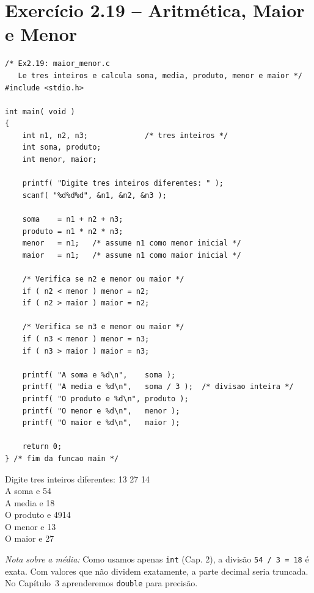 \documentclass[12pt,a4paper]{article}
\begin{document}
\section{Exercício 2.19 -- Aritmética, Maior e Menor}

\begin{respostabox}[title={Exercício 2.19 -- Soma, média, produto, menor e maior}]
\begin{lstlisting}
/* Ex2.19: maior_menor.c
   Le tres inteiros e calcula soma, media, produto, menor e maior */
#include <stdio.h>

int main( void )
{
    int n1, n2, n3;             /* tres inteiros */
    int soma, produto;
    int menor, maior;

    printf( "Digite tres inteiros diferentes: " );
    scanf( "%d%d%d", &n1, &n2, &n3 );

    soma    = n1 + n2 + n3;
    produto = n1 * n2 * n3;
    menor   = n1;   /* assume n1 como menor inicial */
    maior   = n1;   /* assume n1 como maior inicial */

    /* Verifica se n2 e menor ou maior */
    if ( n2 < menor ) menor = n2;
    if ( n2 > maior ) maior = n2;

    /* Verifica se n3 e menor ou maior */
    if ( n3 < menor ) menor = n3;
    if ( n3 > maior ) maior = n3;

    printf( "A soma e %d\n",    soma );
    printf( "A media e %d\n",   soma / 3 );  /* divisao inteira */
    printf( "O produto e %d\n", produto );
    printf( "O menor e %d\n",   menor );
    printf( "O maior e %d\n",   maior );

    return 0;
} /* fim da funcao main */
\end{lstlisting}

\begin{saida}
Digite tres inteiros diferentes: 13 27 14\\
A soma e 54\\
A media e 18\\
O produto e 4914\\
O menor e 13\\
O maior e 27
\end{saida}

\textit{Nota sobre a média:} Como usamos apenas \texttt{int} (Cap. 2), a divisão \texttt{54 / 3 = 18} é exata. Com valores que não dividem exatamente, a parte decimal seria truncada. No Capítulo~3 aprenderemos \texttt{double} para precisão.
\end{respostabox}
\end{document}
